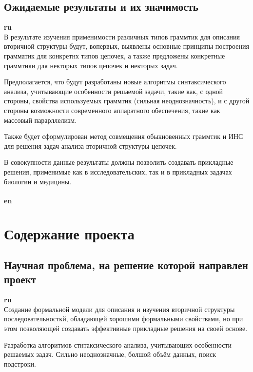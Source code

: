 \documentclass[12pt]{article}  %
\theoremstyle{remark}
\begin{document}
\subsection{Ожидаемые результаты и их значимость}

\textbf{ru}\\
В результате изучения применимости различных типов граммтик для описания вторичной структуры будут, вопервых, выявлены основные принципы построения грамматик для конкретнх типов цепочек, а также предложены конкретные граммтики для некторых типов цепочек и некторых задач.

Предполагается, что будут разработаны новые алгоритмы синтаксического анализа, учитывающие особенности решаемой задачи, такие как, с одной стороны, свойства используемых граммтик (сильная неоднозначность), и с другой стороны возможности современного аппаратного обеспечения, такие как массовый парарллелизм.

Также будет сформулирован метод совмещения обыкновенных граммтик и ИНС для решения задач анализа вторичной структуры цепочек.

В совокупности данные результаты должны позволить создавать прикладные решения, применимые как в исследовательских, так и в прикладных задачах биологии и медицины.
\\
\\
\textbf{en}\\


\section{Содержание проекта}

\subsection{Научная проблема, на решение которой направлен проект}

\textbf{ru}\\
Создание формальной модели для описания и изучения вторичной структуры последовательносткй, обладающей хорошими формальными свойствами, но при этом позволяющей создавать эффективные прикладные решения на своей основе.

Разработка алгоритмов стнтаксического анализа, учитывающих особенности решаемых задач.
Сильно неоднозначные, болшой объём данных, поиск подстроки.
\end{document}
